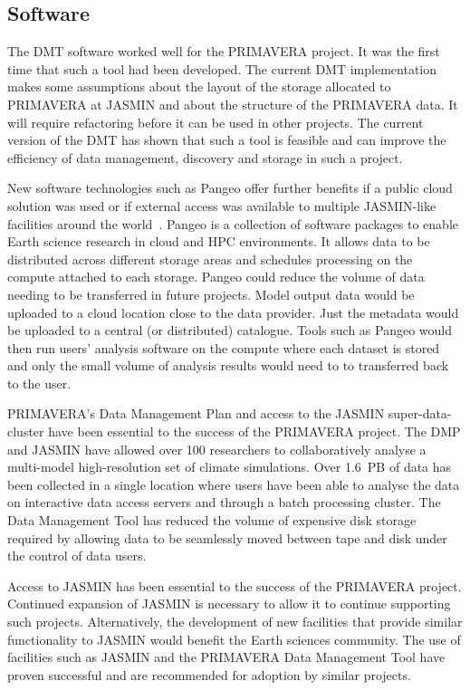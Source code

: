 \documentclass[gmd, manuscript]{copernicus}
\begin{document}
\subsection{Software}

The DMT software worked well for the PRIMAVERA project. It was the first time that such a tool had been developed. The current DMT implementation makes some assumptions about the layout of the storage allocated to PRIMAVERA at JASMIN and about the structure of the PRIMAVERA data. It will require refactoring before it can be used in other projects. The current version of the DMT has shown that such a tool is feasible and can improve the efficiency of data management, discovery and storage in such a project.

New software technologies such as Pangeo offer further benefits if a public cloud solution was used or if external access was available to multiple JASMIN-like facilities around the world~\citep{Pangeo}. Pangeo is a collection of software packages to enable Earth science research in cloud and HPC environments. It allows data to be distributed across different storage areas and schedules processing on the compute attached to each storage. Pangeo could reduce the volume of data needing to be transferred in future projects. Model output data would be uploaded to a cloud location close to the data provider. Just the metadata would be uploaded to a central (or distributed) catalogue. Tools such as Pangeo would then run users' analysis software on the compute where each dataset is stored and only the small volume of analysis results would need to to transferred back to the user.

\conclusions  %

PRIMAVERA's Data Management Plan and access to the JASMIN super-data-cluster have been essential to the success of the PRIMAVERA project. The DMP and JASMIN have allowed over 100 researchers to collaboratively analyse a multi-model high-resolution set of climate simulations. Over 1.6~PB of data has been collected in a single location where users have been able to analyse the data on interactive data access servers and through a batch processing cluster. The Data Management Tool has reduced the volume of expensive disk storage required by allowing data to be seamlessly moved between tape and disk under the control of data users.

Access to JASMIN has been essential to the success of the PRIMAVERA project. Continued expansion of JASMIN is necessary to allow it to continue supporting such projects. Alternatively, the development of new facilities that provide similar functionality to JASMIN would benefit the Earth sciences community. The use of facilities such as JASMIN and the PRIMAVERA Data Management Tool have proven successful and are recommended for adoption by similar projects.
\end{document}
